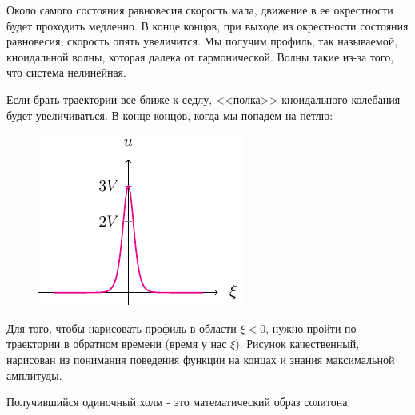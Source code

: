 Около самого состояния равновесия скорость мала, движение в ее окрестности будет проходить медленно. В конце концов, при выходе из окрестности состояния равновесия, скорость опять увеличится. Мы получим профиль, так называемой, кноидальной волны, которая далека от гармонической. Волны такие из-за того, что система нелинейная. 

Если брать траектории все ближе к седлу, <<полка>> кноидального колебания будет увеличиваться. В конце концов, когда мы попадем на петлю:
\begin{figure}[H]
	\centering
	\includegraphics[scale=1.5]{img/soliton/3v}
\end{figure}
Для того, чтобы нарисовать профиль в области $\xi<0$, нужно пройти по траектории в обратном времени (время у нас $\xi$). Рисунок качественный, нарисован из понимания поведения функции на концах и знания максимальной амплитуды. 

Получившийся одиночный холм - это математический образ солитона.

